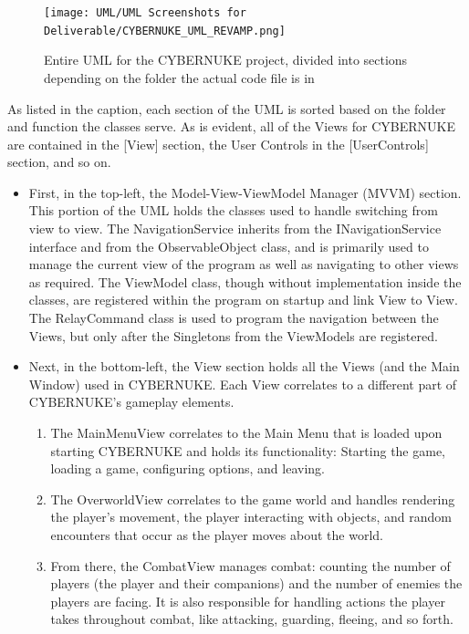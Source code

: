 \documentclass[10pt,conference,onecolumn,compsoc]{IEEEtran}
\begin{document}
\begin{figure}[h]
\centering
\texttt{[image: UML/UML Screenshots for Deliverable/CYBERNUKE\_UML\_REVAMP.png]}
\caption{Entire UML for the CYBERNUKE project, divided into sections depending on the folder the actual code file is in}
\label{uml_view}
\end{figure}

As listed in the caption, each section of the UML is sorted based on the folder and function the classes serve. As is evident, all of the Views for CYBERNUKE are contained in the [View] section, the User Controls in the [UserControls] section, and so on.

\begin{itemize}

\item First, in the top-left, the Model-View-ViewModel Manager (MVVM) section. This portion of the UML holds the classes used to handle switching from view to view. The NavigationService inherits from the INavigationService interface and from the ObservableObject class, and is primarily used to manage the current view of the program as well as navigating to other views as required. The ViewModel class, though without implementation inside the classes, are registered within the program on startup and link View to View. The RelayCommand class is used to program the navigation between the Views, but only after the Singletons from the ViewModels are registered.

\item Next, in the bottom-left, the View section holds all the Views (and the Main Window) used in CYBERNUKE. Each View correlates to a different part of CYBERNUKE's gameplay elements. 

	\begin{enumerate}

	\item The MainMenuView correlates to the Main Menu that is loaded upon starting CYBERNUKE and holds its functionality: Starting the game, loading a game, configuring options, and leaving. 

	\item The OverworldView correlates to the game world and handles rendering the player's movement, the player interacting with objects, and random encounters that occur as the player moves about the world.

	\item From there, the CombatView manages combat: counting the number of players (the player and their companions) and the number of enemies the players are facing. It is also responsible for handling actions the player takes throughout combat, like attacking, guarding, fleeing, and so forth. 


\end{enumerate}
\end{itemize}
\end{document}
